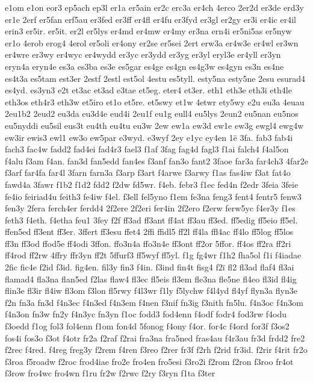 {e1om
e1on
eor3
ep5ach
ep3l
er1a
er5ain
er2c
erc3a
er4ch
4erco
2er2d
er3de
erd3y
er1e
2erf
er5fan
erf5au
er3fed
er3ff
er4fl
er4fu
er3fyd
er3gl
er2gy
er3i
er4ic
er4il
erin3
er5ir.
er5it.
er2l
er5lys
er4md
er4mw
er4my
er3na
ern4i
er5ni5as
er5nyw
er1o
4erob
erog4
4erol
er5oli
er4ony
er2se
er5sei
2ert
erw3a
er4w3e
er4wl
er3wn
er4wre
er3wy
er4wyc
er4wydd
er3yc
er3ydd
er3yg
er3yl
eryl3e
er4yll
er3yn
eryn4a
eryn4e
es3a
es3ba
es3e
es5gar
es4ge
es4gn
es4g3w
es4gyn
es3n
es4ne
es4t3a
es5tam
est3er
2estf
2estl
est5ol
4estu
es5tyll.
esty5na
esty5ne
2esu
esurad4
es4yd.
es3yn3
e2t
et3ac
et3ad
e3tae
et5eg.
eter4
et3er.
eth1
eth3e
eth3i
eth4le
eth3os
eth4r3
eth3w
et5iro
et1o
et5re.
et5swy
et1w
4etwr
ety5wy
e2u
eu3a
4euau
2eu1b2
2eud2
eu3da
eu3d4e
eud4i
2eu1f
eu1g
eull4
eu5lys
2eun2
eu5nan
eu5nos
eu5nyddi
eu5sil
eus3t
eu4th
eu4tu
eu3w
2ew
ew1a
ew3d
ew1e
ew3g
ewgl4
ewg4w
ew3ir
ewis3
ewl1
ew3o
ew5par
e3wyd.
e3wyf
2ey
e1yc
ey4en
1^^eb
3fa.
fab3
fab4i
fach3
fac4w
fadd2
fad4ei
fad4r3
fael3
f1af
3fag
fag4d
fagl3
f1ai
falch4
f4al5on
f4alu
f3am
f4an.
fan3d
fan5edd
fan4es
f3anf
fan3o
fant2
3faoe
far3a
far4ch3
4far2e
f3arf
far4fa
far4l
3farn
farn3a
f3arp
f3art
f4arwe
f3arwy
f1as
fas4iw
f3at
fat4o
fawd4a
3fawr
f1b2
f1d2
fdd2
f2dw
fd5wr.
f4eb.
febr3
f1ec
fed4n
f2edr
3feia
3feie
fe4io
feiriad4u
feith3
fe4iw
f4el.
f3ell
fel5yno
f1em
fe3na
feng3
fent4
fentr5
fenw3
fen3y
2fera
ferch4er
ferdd4
2f2ere
2f2eri
fer4in
2f2ero
f2erw
ferw5yc
f4er3y
f1es
feth3
f4eth.
f4etha
feu1
3fey
f2f
ff3ad
ff3ant
ff4at
ff3au
ff3ed.
ff5edig
ff5eio
ff5el.
ffen5ed
ff3ent
ff3er.
3ffert
ff3esu
ffet4
2ffi
ffidl5
ff2l
ff4la
ffl4ac
ff4lo
ff5log
ff5los
ff3n
ff3od
ffod5e
ff4odi
3ffon.
ffo3n4a
ffo3n4e
ff3ont
ff2or
5ffor.
ff4os
ff2ra
ff2ri
ff4rod
ff2rw
4ffry
ffr3yn
ff2t
5ffurf3
ff5wyf
ff5yl.
f1g
fg4wr
f1h2
fha5ol
f1i
f4iadae
2fic
fic4e
f2id
f3id.
fig4en.
fil3y
fin3
f4in.
f3ind
fin4t
fisg4
f2^^ef
fl2
fl3ad
flaf4
fl3ai
flamad4
fla3na
flan5ed
f2las
flaw4
fl3ec
fl5eis
fl3em
fle3na
fle5ne
fl4eo
fl3id
fl4ig
flin3e
fl3ir
fl4iw
fl3om
f3lon
fl5rwy
f4l3wr
f1ly
f5lychw
f4l4yd
fl4yf
flyn3a
flyn3e
f2n
fn3a
fn3d
f4n3ec
f4n3ed
f4n3em
f4nen
f3nif
fn3ig
f3nith
fn5lu.
f4n3oc
f4n3om
f4n3on
fn3w
fn2y
f4n3yc
fn3yn
f1oc
fodd3
fod4enn
f4odf
fodr4
fod3rw
f4odu
f3oedd
f1og
fol3
fol4enn
f1om
fon4d
5fonog
f4ony
f4or.
for4c
f4ord
for3f
f3os2
fos4i
fos3o
f3ot
f4otr
fr2a
f2raf
f2rai
fra3na
fra5ned
fras4au
f4r3au
fr3d
frdd2
fre2
f2rec
f4red.
f4reg
freg3y
f2rem
f4ren
f3reo
f2rer
fr3f
f2rh
f2rid
fr3id.
f2rir
f4rit
fr2o
f3roa
f5roadw
f2roc
frod4iae
fro2e
fro4en
fro5esi
f3ro2i
f2rom
f2ron
f3roo
fr4ot
f3row
fro4wc
fro4wn
f1ru
fr2w
f2rwc
f2ry
f3ryn
f1ta
f3ter
}
